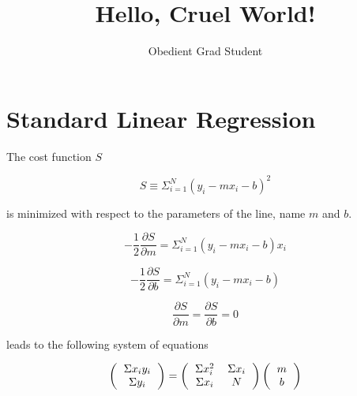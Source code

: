 \documentclass{article}
\title{Hello, Cruel World!}
\author{Obedient Grad Student}
\begin{document}
\maketitle

\section{Standard Linear Regression}

The cost function $S$

\begin{equation}
S \equiv \Sigma_{i=1}^{N} \left( y_{i} - m x_{i} - b \right)^{2}
\end{equation}

is minimized with respect to the parameters of the line, name $m$ and $b$.

\begin{equation}
-\frac{1}{2}\frac{\partial S}{\partial m} = \Sigma_{i=1}^{N} \left( y_{i} - m x_{i} - b \right) x_{i}
\end{equation}

\begin{equation}
-\frac{1}{2}\frac{\partial S}{\partial b} = \Sigma_{i=1}^{N} \left( y_{i} - m x_{i} - b \right)
\end{equation}

\begin{equation}
\frac{\partial S}{\partial m} = \frac{\partial S}{\partial b} = 0
\end{equation}


leads to the following system of equations

\begin{equation}
\left(
\begin{tabular}{c}
$\Sigma x_{i} y_{i}$ \\
$\Sigma y_{i}$
\end{tabular}
\right) = 
\left(
\begin{tabular}{cc}
$ \Sigma x_{i}^{2} $ & $\Sigma x_{i} $ \\
$ \Sigma x_{i} $ & $N$ \\
\end{tabular}
\right)
\left(
\begin{tabular}{c}
$m$ \\
$b$
\end{tabular}
\right)
\end{equation}
\end{document}
